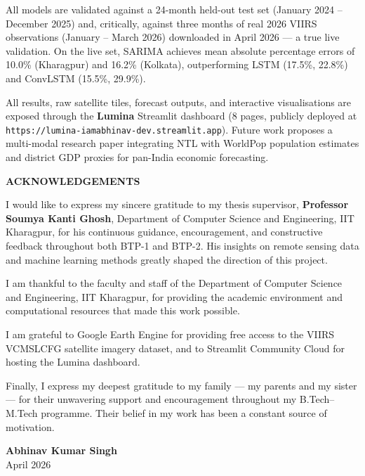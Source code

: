 \documentclass[12pt,a4paper]{report}
\begin{document}
All models are validated against a 24-month held-out test set (January 2024 -- December 2025) and,
critically, against three months of real 2026 VIIRS observations (January -- March 2026) downloaded
in April 2026 --- a true live validation. On the live set, SARIMA achieves mean absolute percentage
errors of 10.0\% (Kharagpur) and 16.2\% (Kolkata), outperforming LSTM (17.5\%, 22.8\%) and
ConvLSTM (15.5\%, 29.9\%).

All results, raw satellite tiles, forecast outputs, and interactive visualisations are exposed
through the \textbf{Lumina} Streamlit dashboard (8 pages, publicly deployed at
\texttt{https://lumina-iamabhinav-dev.streamlit.app}). Future work proposes a multi-modal research paper
integrating NTL with WorldPop population estimates and district GDP proxies for pan-India
economic forecasting.

\newpage
\thispagestyle{empty}
\begin{center}
    \hypertarget{sec:ack}{}%
    {\Large \textbf{ACKNOWLEDGEMENTS}}\\[1cm]
\end{center}

I would like to express my sincere gratitude to my thesis supervisor, \textbf{Professor Soumya Kanti Ghosh}, Department of Computer Science and Engineering, IIT Kharagpur, for his continuous guidance, encouragement, and constructive feedback throughout both BTP-1 and BTP-2. His insights on remote sensing data and machine learning methods greatly shaped the direction of this project.

I am thankful to the faculty and staff of the Department of Computer Science and Engineering, IIT Kharagpur, for providing the academic environment and computational resources that made this work possible.

I am grateful to Google Earth Engine for providing free access to the VIIRS VCMSLCFG satellite imagery dataset, and to Streamlit Community Cloud for hosting the Lumina dashboard.

Finally, I express my deepest gratitude to my family --- my parents and my sister --- for their unwavering support and encouragement throughout my B.Tech--M.Tech programme. Their belief in my work has been a constant source of motivation.

\hfill \textbf{Abhinav Kumar Singh}\\
\hfill April 2026
\end{document}
